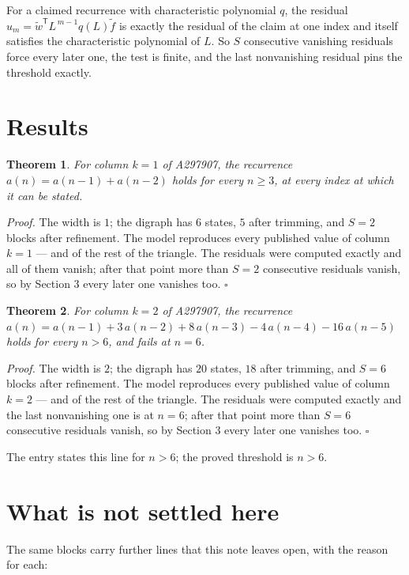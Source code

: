 \documentclass[11pt]{article}
\newtheorem{theorem}{Theorem}
\theoremstyle{definition}
\begin{document}
For a claimed recurrence with characteristic polynomial $q$, the residual $u_m = \tilde w^{\mathsf T}L^{\,m-1}q(L)\tilde f$ is exactly the residual of the claim at one index and itself satisfies the characteristic polynomial of $L$. So $S$ consecutive vanishing residuals force every later one, the test is finite, and the last nonvanishing residual pins the threshold exactly.

\section{Results}

\begin{theorem} For column $k = 1$ of A297907, the recurrence $a(n) = a(n-1) + a(n-2)$ holds for every $n \ge 3$, at every index at which it can be stated.\end{theorem}

{\itshape Proof.} The width is $1$; the digraph has $6$ states, $5$ after trimming, and $S = 2$ blocks after refinement. The model reproduces every published value of column $k = 1$ --- and of the rest of the triangle. The residuals were computed exactly and all of them vanish; after that point more than $S = 2$ consecutive residuals vanish, so by Section 3 every later one vanishes too. $\square$

\begin{theorem} For column $k = 2$ of A297907, the recurrence $a(n) = a(n-1) + 3\,a(n-2) + 8\,a(n-3) - 4\,a(n-4) - 16\,a(n-5)$ holds for every $n > 6$, and fails at $n = 6$.\end{theorem}

{\itshape Proof.} The width is $2$; the digraph has $20$ states, $18$ after trimming, and $S = 6$ blocks after refinement. The model reproduces every published value of column $k = 2$ --- and of the rest of the triangle. The residuals were computed exactly and the last nonvanishing one is at $n = 6$; after that point more than $S = 6$ consecutive residuals vanish, so by Section 3 every later one vanishes too. $\square$

The entry states this line for $n > 6$; the proved threshold is $n > 6$.

\section{What is not settled here}

The same blocks carry further lines that this note leaves open, with the reason for each:
\end{document}

